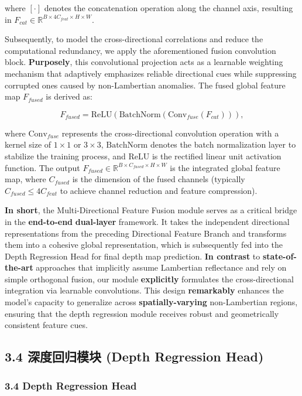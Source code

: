 where $[\cdot]$ denotes the concatenation operation along the channel axis, resulting in $F_{cat} \in \mathbb{R}^{B \times 4C_{feat} \times H \times W}$.

Subsequently, to model the cross-directional correlations and reduce the computational redundancy, we apply the aforementioned fusion convolution block. \textbf{Purposely}, this convolutional projection acts as a learnable weighting mechanism that adaptively emphasizes reliable directional cues while suppressing corrupted ones caused by non-Lambertian anomalies. The fused global feature map $F_{fused}$ is derived as:

\[
F_{fused} = \text{ReLU}(\text{BatchNorm}(\text{Conv}_{fuse}(F_{cat}))), \tag{2}
\]

where $\text{Conv}_{fuse}$ represents the cross-directional convolution operation with a kernel size of $1 \times 1$ or $3 \times 3$, $\text{BatchNorm}$ denotes the batch normalization layer to stabilize the training process, and $\text{ReLU}$ is the rectified linear unit activation function. The output $F_{fused} \in \mathbb{R}^{B \times C_{fused} \times H \times W}$ is the integrated global feature map, where $C_{fused}$ is the dimension of the fused channels (typically $C_{fused} \le 4C_{feat}$ to achieve channel reduction and feature compression).

\textbf{In short}, the Multi-Directional Feature Fusion module serves as a critical bridge in the \textbf{end-to-end} \textbf{dual-layer} framework. It takes the independent directional representations from the preceding Directional Feature Branch and transforms them into a cohesive global representation, which is subsequently fed into the Depth Regression Head for final depth map prediction. \textbf{In contrast} to \textbf{state-of-the-art} approaches that implicitly assume Lambertian reflectance and rely on simple orthogonal fusion, our module \textbf{explicitly} formulates the cross-directional integration via learnable convolutions. This design \textbf{remarkably} enhances the model's capacity to generalize across \textbf{spatially-varying} non-Lambertian regions, ensuring that the depth regression module receives robust and geometrically consistent feature cues.

\subsection{3.4 深度回归模块 (Depth Regression Head)}

\subsubsection{3.4 Depth Regression Head}

